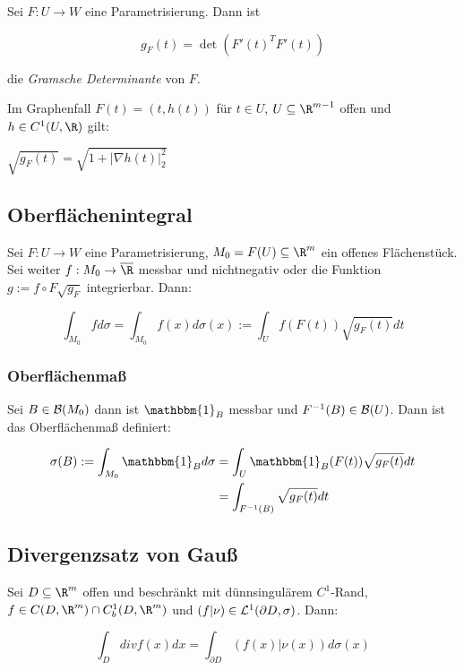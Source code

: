 Sei $F : U \to W$ eine Parametrisierung. Dann ist

\vspace{-2mm}
$$g_F(t) = \det(F'(t)^TF'(t))$$

die \emph{Gramsche Determinante} von $F$.

\vspace{2mm}

Im Graphenfall $F(t) = (t,h(t))$ für $t \in U$, $U \subseteq \R^{m-1}$ offen und $h \in C^1(U,\R)$ gilt:

$\sqrt{g_F(t)} = \sqrt{1+|\nabla h(t)|_2^2}$

\subsection*{Oberflächenintegral}

Sei $F : U \to W$ eine Parametrisierung, $M_0 = F(U) \subseteq \R^m$ ein offenes Flächenstück. Sei weiter $f : M_0 \to \overline\R$ messbar und nichtnegativ oder die Funktion $g := f \circ F \sqrt{g_F}$ integrierbar. Dann:

\vspace{-4mm}
$$\int_{M_0} f d\sigma = \int_{M_0} f(x) d\sigma(x) := \int_U f(F(t))\sqrt{g_F(t)} dt$$

\subsubsection*{Oberflächenmaß}

Sei $B \in \mathcal{B}(M_0)$ dann ist $\mathbbm{1}_B$ messbar und $F^{-1}(B) \in \mathcal{B}(U)$. Dann ist das Oberflächenmaß definiert:

\vspace{-4mm}
\begin{align*}
\sigma(B) := \int_{M_0} \mathbbm{1}_B d\sigma &= \int_U \mathbbm{1}_B(F(t)) \sqrt{g_F(t)} dt\\
                             &= \int_{F^{-1}(B)} \sqrt{g_F(t)} dt
\end{align*}

\subsection*{Divergenzsatz von Gauß}

Sei $D \subseteq \R^m$ offen und beschränkt mit dünnsingulärem $C^1$-Rand, $f \in C(D,\R^m) \cap C_b^1(D,\R^m)$ und $(f|\nu) \in \mathcal{L}^1(\partial D,\sigma)$. Dann:

$$\int_D div f(x) dx = \int_{\partial D} (f(x)|\nu(x)) d\sigma(x)$$

